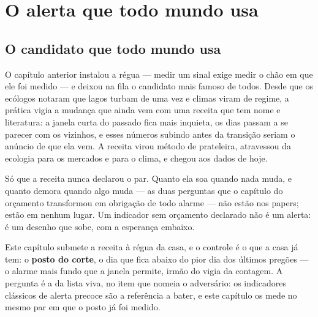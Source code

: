 %
%

\chapter{O alerta que todo mundo usa}
\label{cap:alerta}

\section{O candidato que todo mundo usa}

O capítulo anterior instalou a régua --- medir um sinal exige medir o chão em que ele foi medido
--- e deixou na fila o candidato mais famoso de todos. Desde que os ecólogos notaram que lagos
turbam de uma vez e climas viram de regime, a prática vigia a mudança que ainda vem com uma
receita que tem nome e literatura: a janela curta do passado fica mais inquieta, os dias passam
a se parecer com os vizinhos, e esses números subindo antes da transição seriam o anúncio de
que ela vem\cite{scheffer2003catastrophic,scheffer2009early}. A receita virou método de
prateleira\cite{dakos2012methods}, atravessou da ecologia para os mercados e para o clima, e
chegou aos dados de hoje\cite{miramontes2026early}.

Só que a receita nunca declarou o par. Quanto ela soa quando nada muda, e quanto demora quando
algo muda --- as duas perguntas que o capítulo do orçamento transformou em obrigação de todo
alarme --- não estão nos papers; estão em nenhum lugar. Um indicador sem orçamento declarado
não é um alerta: é um desenho que sobe, com a esperança embaixo.

Este capítulo submete a receita à régua da casa, e o controle é o que a casa já tem: o
\textbf{posto do corte}, o dia que fica abaixo do pior dia dos últimos
\numAlertaJanela{} pregões --- o alarme mais fundo que a janela permite, irmão do vigia da
contagem. A pergunta é a da lista viva, no item que nomeia o adversário: os indicadores
clássicos de alerta precoce são a referência a bater, e este capítulo os mede no mesmo par em
que o posto já foi medido.

